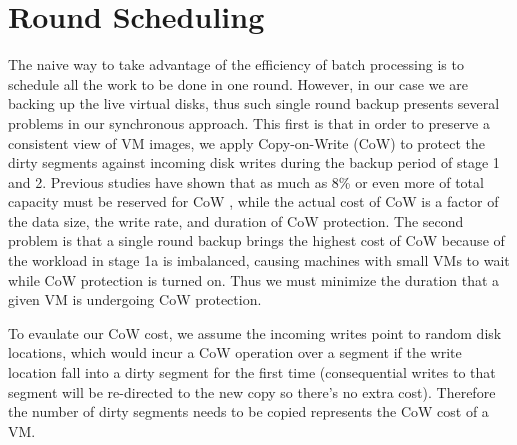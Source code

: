 \section{Round Scheduling}
\label{sect:scheduling}
The naive way to take advantage of the efficiency of batch processing is to
schedule all the work to be done in one round.  
However, in our case we are backing up the
live virtual disks, thus such single round backup presents several problems
in our synchronous approach.
This first is that in order to preserve a consistent view of VM images, we apply
Copy-on-Write (CoW) to protect the dirty segments against incoming disk writes during 
the backup period of stage 1 and 2.
Previous studies have shown that as much as 8\% or even more of total capacity must be reserved for
CoW \cite{EMCIncrementalDataChanges}, while the actual cost of CoW is a factor of the
data size, the write rate, and duration of CoW protection.
The second problem is that a single round backup brings the highest cost of CoW
because of the workload in stage 1a is imbalanced,
causing machines with small VMs to wait while CoW protection is turned on.
Thus we must minimize the duration that a given VM is undergoing CoW protection.

To evaulate our CoW cost, we assume the incoming writes point to random disk locations, 
which would incur a CoW operation over a segment if the write location fall into a dirty segment
for the first time (consequential writes to that segment will be re-directed 
to the new copy so there's no extra cost). Therefore the number of dirty segments needs to be copied represents
the CoW cost of a VM.


